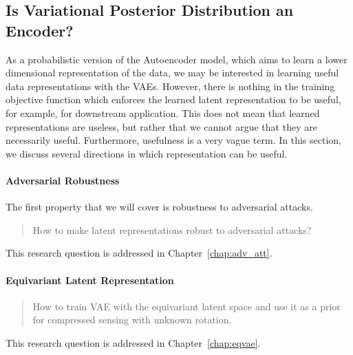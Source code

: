 \subsection{Is Variational Posterior Distribution an Encoder?}
As a probabilistic version of the Autoencoder model, which aims to learn a lower dimensional representation of the data, we may be interested in learning useful data representations with the VAEs. However, there is nothing in the training objective function which enforces the learned latent representation to be useful, for example, for downstream application. This does not mean that learned representations are useless, but rather that we cannot argue that they are necessarily useful. Furthermore, usefulness is a very vague term. In this section, we discuss several directions in which representation can be useful. 


\paragraph{Adversarial Robustness}
The first property that we will cover is robustness to adversarial attacks. 

\begin{quote}
	How  to make latent representations robust to adversarial attacks?
\end{quote}
This research question is addressed in Chapter~\ref{chap:adv_att}.

\paragraph{Equivariant Latent Representation}

\begin{quote}
	How to train VAE with the equivariant latent space and use it as a prior for compressed sensing with unknown rotation.
\end{quote}
This research question is addressed in Chapter~\ref{chap:eqvae}.


